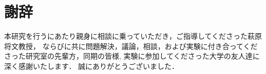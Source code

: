 \chapter*{謝辞}
本研究を行うにあたり親身に相談に乗っていただき，ご指導してくださった萩原将文教授，
ならびに共に問題解決，議論，相談，および実験に付き合ってくださった研究室の先輩方，同期の皆様,
実験に参加してくださった大学の友人達に深く感謝いたします．
誠にありがとうございました．